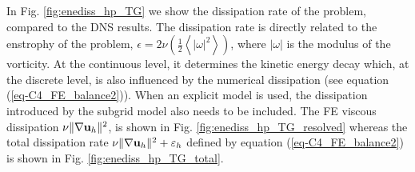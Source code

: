 
In Fig. \ref{fig:enediss_hp_TG} we show the dissipation rate of the problem, compared to the DNS results. The dissipation rate is directly related to the enstrophy of the problem, $\epsilon = 2\nu\left(\frac{1}{2}\left\langle|\omega|^2\right\rangle\right)$, where $|\omega|$ is the modulus of the vorticity. At the continuous level, it determines the kinetic energy decay which, at the discrete level, is also influenced by the numerical dissipation (see equation (\ref{eq-C4_FE_balance2})). When an explicit model is used, the dissipation introduced by the subgrid model also needs to be included. The FE viscous dissipation $\nu\|\nabla{\bf u}_h\|^2$, is shown in Fig. \ref{fig:enediss_hp_TG_resolved} whereas the total dissipation rate $ \nu\|\nabla{\bf u}_h\|^2 + \varepsilon_{h}$ defined by equation (\ref{eq-C4_FE_balance2}) is shown in Fig. \ref{fig:enediss_hp_TG_total}. 


